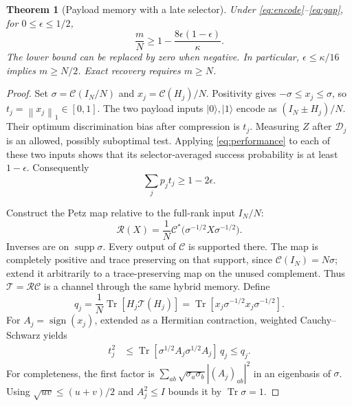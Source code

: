 \documentclass[11pt]{article}
\newtheorem{theorem}{Theorem}
\newcommand{\Tr}{\operatorname{Tr}}
\newcommand{\supp}{\operatorname{supp}}
\newcommand{\norm}[1]{\left\lVert#1\right\rVert}
\begin{document}
\begin{theorem}[Payload memory with a late selector]\label{thm:memory}
Under \eqref{eq:encode}--\eqref{eq:gap}, for $0\le\epsilon\le1/2$,
\begin{equation}
 \boxed{\frac mN\ge 1-\frac{8\epsilon(1-\epsilon)}{\kappa}.} \label{eq:main}
\end{equation}
The lower bound can be replaced by zero when negative. In particular,
$\epsilon\le\kappa/16$ implies $m\ge N/2$. Exact recovery requires $m\ge N$.
\end{theorem}

\begin{proof}
Set $\sigma=\mathcal C(I_N/N)$ and $x_j=\mathcal C(H_j)/N$.
Positivity gives $-\sigma\le x_j\le\sigma$, so
$t_j=\norm{x_j}_1\in[0,1]$. The two payload inputs $|0\rangle,|1\rangle$
encode as $(I_N\pm H_j)/N$. Their optimum discrimination bias after
compression is $t_j$. Measuring $Z$ after $\mathcal D_j$ is an allowed,
possibly suboptimal test. Applying \eqref{eq:performance} to each of these
two inputs shows that its selector-averaged success probability is at least
$1-\epsilon$. Consequently
\begin{equation}
 \sum_jp_jt_j\ge1-2\epsilon. \label{eq:bias}
\end{equation}

Construct the Petz map relative to the full-rank input $I_N/N$:
\begin{equation}
 \mathcal R(X)=\frac1N\mathcal C^*\bigl(\sigma^{-1/2}X\sigma^{-1/2}\bigr).
 \label{eq:petz}
\end{equation}
Inverses are on $\supp\sigma$. Every output of $\mathcal C$ is supported
there. The map is completely positive and trace preserving on that support,
since $\mathcal C(I_N)=N\sigma$; extend it arbitrarily to a trace-preserving
map on the unused complement. Thus $\mathcal T=\mathcal R\mathcal C$ is a
channel through the same hybrid memory. Define
\begin{equation}
 q_j=\frac1N\Tr[H_j\mathcal T(H_j)]
 =\Tr[x_j\sigma^{-1/2}x_j\sigma^{-1/2}].
\end{equation}
For $A_j=\operatorname{sign}(x_j)$, extended as a Hermitian contraction,
weighted Cauchy--Schwarz yields
\begin{align}
 t_j^2
 &\le \Tr[\sigma^{1/2}A_j\sigma^{1/2}A_j]\,q_j\le q_j. \label{eq:bridge}
\end{align}
For completeness, the first factor is
$\sum_{ab}\sqrt{\sigma_a\sigma_b}|(A_j)_{ab}|^2$ in an eigenbasis of
$\sigma$. Using $\sqrt{uv}\le(u+v)/2$ and $A_j^2\le I$ bounds it by
$\Tr\sigma=1$.


\end{proof}
\end{document}
